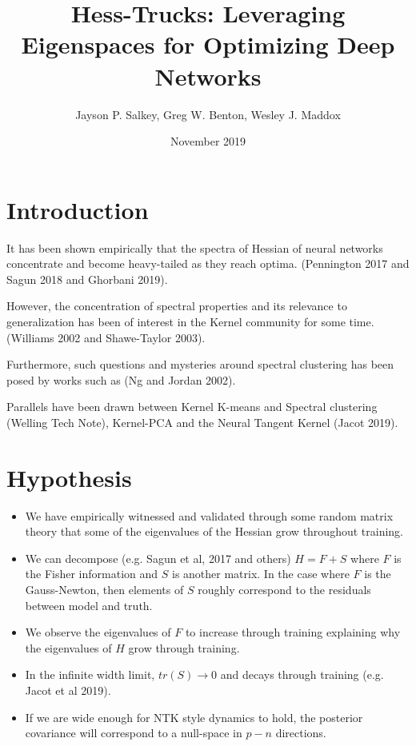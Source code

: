 \documentclass{article}
\title{Hess-Trucks: Leveraging Eigenspaces for Optimizing Deep Networks}
\author{Jayson P. Salkey, Greg W. Benton, Wesley J. Maddox}
\date{November 2019}
\begin{document}
\maketitle

\section{Introduction}
It has been shown empirically that the spectra of Hessian of neural networks concentrate and become heavy-tailed as they reach optima. (Pennington 2017 and Sagun 2018 and Ghorbani 2019).

However, the concentration of spectral properties and its relevance to generalization has been of interest in the Kernel community for some time. (Williams 2002 and Shawe-Taylor 2003).

Furthermore, such questions and mysteries around spectral clustering has been posed by works such as (Ng and Jordan 2002).

Parallels have been drawn between Kernel K-means and Spectral clustering (Welling Tech Note), Kernel-PCA and the Neural Tangent Kernel (Jacot 2019).

\section{Hypothesis}
\begin{itemize}
	\item  We have empirically witnessed and validated through some random matrix theory that some of the eigenvalues of the Hessian grow throughout training. 
	\item We can decompose (e.g. Sagun et al, 2017 and others) $H = F + S$ where $F$ is the Fisher information and $S$ is another matrix.
	\subitem In the case where $F$ is the Gauss-Newton, then elements of $S$ roughly correspond to the residuals between model and truth.
	\item We observe the eigenvalues of $F$ to increase through training explaining why the eigenvalues of $H$ grow through training.
	\item In the infinite width limit, $tr(S) \rightarrow 0$ and decays through training (e.g. Jacot et al 2019).
	\item If we are wide enough for NTK style dynamics to hold, the posterior covariance will correspond to a null-space in $p-n$ directions.
\end{itemize}

\end{document}
